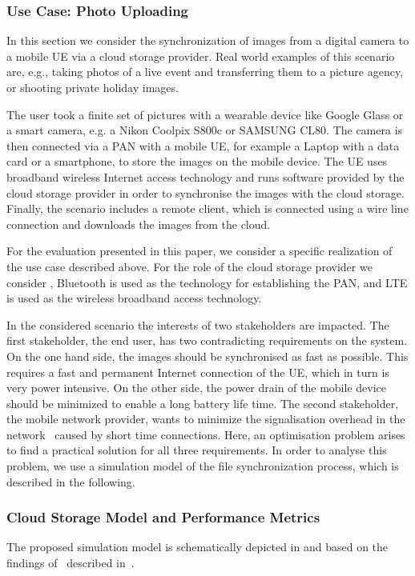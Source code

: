 \subsubsection*{Use Case: Photo Uploading}\label{sec:application:cloud_file_synchronisation:use_case}
In this section we consider the synchronization of images from a digital camera to a mobile \gls{UE} via a cloud storage provider.
Real world examples of this scenario are, e.g., taking photos of a live event and transferring them to a picture agency, or shooting private holiday images. 

The user took a finite set of pictures with a wearable device like Google Glass or a smart camera, e.g. a Nikon Coolpix S800c or SAMSUNG CL80.
The camera is then connected via a \gls{PAN} with a mobile \gls{UE}, for example a Laptop with a data card or a smartphone, to store the images on the mobile device.
The \gls{UE} uses broadband wireless Internet access technology and runs software provided by the cloud storage provider in order to synchronise the images with the cloud storage.
Finally, the scenario includes a remote client, which is connected using a wire line connection and downloads the images from the cloud.

For the evaluation presented in this paper, we consider a specific realization of the use case described above.
For the role of the cloud storage provider we consider \dropbox, Bluetooth is used as the technology for establishing the \gls{PAN}, and \gls{LTE} is used as the wireless broadband access technology.

In the considered scenario the interests of two stakeholders are impacted.
The first stakeholder, the end user, has two contradicting requirements on the system.
On the one hand side, the images should be synchronised as fast as possible. 
This requires a fast and permanent Internet connection of the \gls{UE}, which in turn is very power intensive.
On the other side, the power drain of the mobile device should be minimized to enable a long battery life time.
The second stakeholder, the mobile network provider, wants to minimize the signalisation overhead in the network~\cite{NSN2011, Huawei2011} caused by short time connections.
Here, an optimisation problem arises to find a practical solution for all three requirements. 
In order to analyse this problem, we use a simulation model of the file synchronization process, which is described in the following.

\subsubsection*{Cloud Storage Model and Performance Metrics}\label{sec:application:cloud_file_synchronisation:system_model:model_metrics}
The proposed simulation model is schematically depicted in  and based on the findings of~\cite{Drago2012} described in~.

